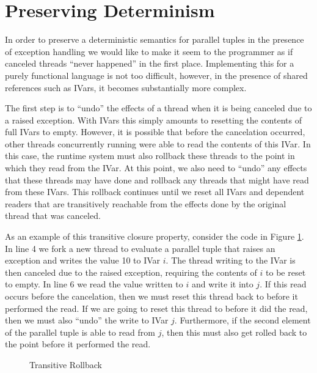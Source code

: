 \section{Preserving Determinism}


In order to preserve a deterministic semantics for parallel tuples in the presence of exception handling we would like to make it seem to the programmer as if canceled threads ``never happened'' in the first place.  Implementing this for a purely functional language is not too difficult, however, in the presence of shared references such as IVars, it becomes substantially more complex.  

The first step is to ``undo'' the effects of a thread when it is being canceled due to a raised exception.  With IVars this simply amounts to resetting the contents of full IVars to empty.  However, it is possible that before the cancelation occurred, other threads concurrently running were able to read the contents of this IVar.  In this case, the runtime system must also rollback these threads to the point in which they read from the IVar.  At this point, we also need to ``undo'' any effects that these threads may have done and rollback any threads that might have read from these IVars. This rollback continues until we reset all IVars and dependent readers that are transitively reachable from the effects done by the original thread that was canceled.  

As an example of this transitive closure property, consider the code in Figure \ref{transitive}.  In line 4 we fork a new thread to evaluate a parallel tuple that raises an exception and writes the value 10 to IVar $i$.  The thread writing to the IVar is then canceled due to the raised exception, requiring the contents of $i$ to be reset to empty.  In line 6 we read the value written to $i$ and write it into $j$.  If this read occurs before the cancelation, then we must reset this thread back to before it performed the read.  If we are going to reset this thread to before it did the read, then we must also ``undo'' the write to IVar $j$.  Furthermore, if the second element of the parallel tuple is able to read from $j$, then this must also get rolled back to the point before it performed the read.  

\begin{figure}

\caption{Transitive Rollback}
\label{transitive}
\end{figure}







